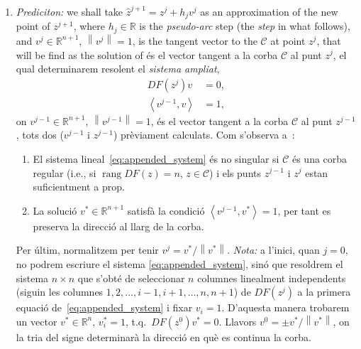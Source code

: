 \documentclass[11pt,reqno,twoside]{article}
\newcommand{\R}{\ensuremath{\mathbb{R}}}
\theoremstyle{remark}
\begin{document}
\begin{enumerate}[label = \emph{\arabic*.}]
  \item \emph{Prediciton:} we shall take $\hat{z}^{j+1} = z^{j} + h_{j}
    v^{j}$ as an approximation of the new point of
    $z^{j+1}$, where $h_{j}\in\R$ is the \emph{pseudo-arc} step (the
    \emph{step} in what follows), and 
    $v^{j}\in\R^{n+1}$, $\left\|v^{j}\right\| = 1$,
    is the tangent vector to the $\mathcal{C}$ at point $z^{j}$, that will
    be find as the solution of 
    és el vector tangent a la corba $\mathcal{C}$ al punt $z^{j}$, el qual
    determinarem resolent el \emph{sistema ampliat},  
    \begin{equation}\label{eq:appended_system}
      \begin{split}
      DF\left(z^{j}\right)v &= 0,\\
      \left\langle v^{j-1}, v \right\rangle &= 1, 
    \end{split}
  \end{equation}
    on $v^{j-1}\in\R^{n+1}$, $\left\|v^{j-1}\right\|=1$, és el vector
    tangent a la corba $\mathcal{C}$ al punt $z^{j-1}$, tots dos ($v^{j-1}$
    i $z^{j-1}$) prèviament calculats. Com s'observa
    a~\cite{Kuznetsov2004}:
    \begin{enumerate}[label = (\roman*)] 
      \item El sistema lineal~\eqref{eq:appended_system} és no singular si
	$\mathcal{C}$ és una corba regular (i.e., si
	$\mathop{\mathrm{rang}} DF(z) = n$, $z\in\mathcal{C}$) i els punts
	$z^{j-1}$ i $z^{j}$ estan suficientment a prop.
      \item La solució $v^{\ast}\in\R^{n+1}$ satisfà la condició
	  $\left\langle v^{j-1}, v^{\ast}\right\rangle = 1$, per tant es preserva la
	  direcció al llarg de la corba.
     \end{enumerate}
     Per últim, normalitzem per tenir $v^{j} =
     v^{\ast}/\left\|v^{\ast}\right\|$. \emph{Nota:} a l'inici, quan $j =
     0$, no podrem
     escriure el sistema \eqref{eq:appended_system}, sinó que resoldrem el
     sistema $n\times n$ que s'obté de seleccionar $n$ columnes linealment
     independents
     (siguin les columnes $1,2,\dots,i-1,i+1,\dots,n,n+1$) de
     $DF(z^{j})$ a la primera equació 
     de~\eqref{eq:appended_system} i fixar 
     $v_{i} = 1$. D'aquesta manera trobarem un vector $v^{\ast}\in\R^{n}$, 
     $v^{\ast}_{i} = 1$, t.q.~$DF(z^{0})v^{\ast} = 0$. Llavors $v^{0} =
     \pm v^{\ast}/\left\|v^{\ast}\right\|$, on la tria del signe determinarà
     la direcció en què es continua la corba.


\end{enumerate}
\end{document}
